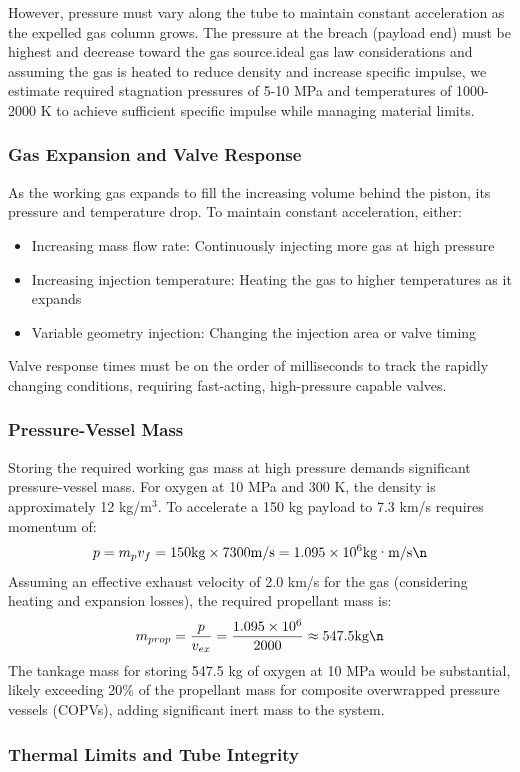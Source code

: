 \documentclass{article}
\begin{document}
However, pressure must vary along the tube to maintain constant acceleration as the expelled gas column grows. The pressure at the breach (payload end) must be highest and decrease toward the gas source.\n\nUsing ideal gas law considerations and assuming the gas is heated to reduce density and increase specific impulse, we estimate required stagnation pressures of 5-10 MPa and temperatures of 1000-2000 K to achieve sufficient specific impulse while managing material limits.\n\n\subsubsection{Gas Expansion and Valve Response}
As the working gas expands to fill the increasing volume behind the piston, its pressure and temperature drop. To maintain constant acceleration, either:\n\begin{itemize}
    \item Increasing mass flow rate: Continuously injecting more gas at high pressure\n    \item Increasing injection temperature: Heating the gas to higher temperatures as it expands\n    \item Variable geometry injection: Changing the injection area or valve timing\n\end{itemize}
Valve response times must be on the order of milliseconds to track the rapidly changing conditions, requiring fast-acting, high-pressure capable valves.\n\n\subsubsection{Pressure-Vessel Mass}
Storing the required working gas mass at high pressure demands significant pressure-vessel mass. For oxygen at 10 MPa and 300 K, the density is approximately 12 kg/m$^3$. To accelerate a 150 kg payload to 7.3 km/s requires momentum of:\n\begin{equation}
 p = m_p v_f = 150  \text{kg} \times 7300  \text{m/s} = 1.095 \times 10^6  \text{kg·m/s}\n\end{equation}
Assuming an effective exhaust velocity of 2.0 km/s for the gas (considering heating and expansion losses), the required propellant mass is:\n\begin{equation}
 m_{prop} = \frac{p}{v_{ex}} = \frac{1.095 \times 10^6}{2000} \approx 547.5  \text{kg}\n\end{equation}
The tankage mass for storing 547.5 kg of oxygen at 10 MPa would be substantial, likely exceeding 20\% of the propellant mass for composite overwrapped pressure vessels (COPVs), adding significant inert mass to the system.\n\n\subsubsection{Thermal Limits and Tube Integrity}
\end{document}
